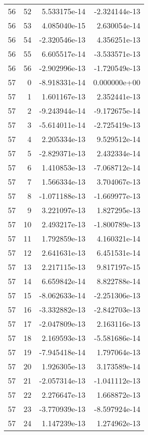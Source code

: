\begin{tabular}{rrrr}
  56 &   52 &  5.533175e-14 & -2.324144e-13 \\
  56 &   53 &  4.085040e-15 &  2.630054e-14 \\
  56 &   54 & -2.320546e-13 &  4.356251e-13 \\
  56 &   55 &  6.605517e-14 & -3.533571e-13 \\
  56 &   56 & -2.902996e-13 & -1.720549e-13 \\
  57 &    0 & -8.918331e-14 &  0.000000e+00 \\
  57 &    1 &  1.601167e-13 &  2.352441e-13 \\
  57 &    2 & -9.243944e-14 & -9.172675e-14 \\
  57 &    3 & -5.614011e-14 & -2.725419e-13 \\
  57 &    4 &  2.205334e-13 &  9.529512e-14 \\
  57 &    5 & -2.829371e-13 &  2.432334e-14 \\
  57 &    6 &  1.410853e-13 & -7.068712e-14 \\
  57 &    7 &  1.566334e-13 &  3.704067e-13 \\
  57 &    8 & -1.071188e-13 & -1.669977e-13 \\
  57 &    9 &  3.221097e-13 &  1.827295e-13 \\
  57 &   10 &  2.493217e-13 & -1.800789e-13 \\
  57 &   11 &  1.792859e-13 &  4.160321e-14 \\
  57 &   12 &  2.641631e-13 &  6.451531e-14 \\
  57 &   13 &  2.217115e-13 &  9.817197e-15 \\
  57 &   14 &  6.659842e-14 &  8.822788e-14 \\
  57 &   15 & -8.062633e-14 & -2.251306e-13 \\
  57 &   16 & -3.332882e-13 & -2.842703e-13 \\
  57 &   17 & -2.047809e-13 &  2.163116e-13 \\
  57 &   18 &  2.169593e-13 & -5.581686e-14 \\
  57 &   19 & -7.945418e-14 &  1.797064e-13 \\
  57 &   20 &  1.926305e-13 &  3.173589e-14 \\
  57 &   21 & -2.057314e-13 & -1.041112e-13 \\
  57 &   22 &  2.276647e-13 &  1.668872e-13 \\
  57 &   23 & -3.770939e-13 & -8.597924e-14 \\
  57 &   24 &  1.147239e-13 &  1.274962e-13 \\

\end{tabular}
